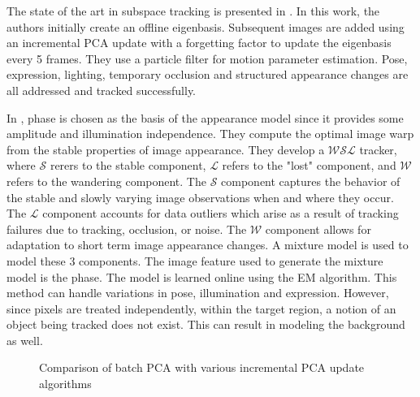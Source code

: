The state of the art in subspace tracking is presented in \cite{2008_JNL_subspaceTRK_Ross}.  In this work, the authors initially create an offline eigenbasis.  Subsequent images are added using an incremental PCA update with a forgetting factor to update the eigenbasis every 5 frames.  They use a particle filter for motion parameter estimation.  Pose, expression, lighting, temporary occlusion and structured appearance changes are all addressed and tracked successfully.

In \cite{2003_JNL_TRKsubspace_Jepson}, phase is chosen as the basis of the appearance model since it provides some amplitude and illumination independence.  They compute the optimal image warp from the stable properties of image appearance.  They develop a $\mathcal{WSL}$ tracker, where $\mathcal{S}$ rerers to the stable component, $\mathcal{L}$ refers to the "lost" component, and $\mathcal{W}$ refers to the wandering component.  The $\mathcal{S}$ component captures the behavior of the stable and slowly varying image observations when and where they occur.  The $\mathcal{L}$ component accounts for data outliers which arise as a result of tracking failures due to tracking, occlusion, or noise.  The $\mathcal{W}$ component allows for adaptation to short term image appearance changes.  A mixture model is used to model these 3 components.  The image feature used to generate the mixture model is the phase.  The model is learned online using the EM algorithm.  This method can handle variations in pose, illumination and expression.  However, since pixels are treated independently, within the target region, a notion of an object being tracked does not exist.  This can result in modeling the background as well. 

								\begin{figure}[t]
								\centering	
								\caption{Comparison of batch PCA with various incremental PCA update algorithms \cite{2008_JNL_TRKsubs_Skocaj}}
								\label{fig:2008_JNL_TRKsub_Skocaj}				
								\end{figure}

